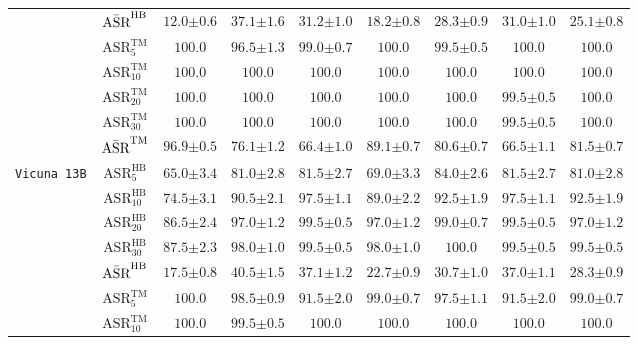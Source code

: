 \begin{table}[t]
{\begin{tabular}{c|c||c|c|c|c||c|c|c}
& $\Bar{\text{ASR}}^{\text{HB}}$ & $12.0{\pm 0.6}$ & $\mathbf{37.1{\pm 1.6}}$ & $31.2{\pm 1.0}$ & $18.2{\pm 0.8}$ & $28.3{\pm 0.9}$ & $31.0{\pm 1.0}$ & $25.1{\pm 0.8}$ \\
\cline{2-9}
& $\text{ASR}^{\text{TM}}_{5}$ & $\mathbf{100.0}$ & $96.5{\pm 1.3}$ & $99.0{\pm 0.7}$ & $\mathbf{100.0}$ & $99.5{\pm 0.5}$ & $\mathbf{100.0}$ & $\mathbf{100.0}$ \\
& $\text{ASR}^{\text{TM}}_{10}$ & $\mathbf{100.0}$ & $\mathbf{100.0}$ & $\mathbf{100.0}$ & $\mathbf{100.0}$ & $\mathbf{100.0}$ & $\mathbf{100.0}$ & $\mathbf{100.0}$ \\
& $\text{ASR}^{\text{TM}}_{20}$ & $\mathbf{100.0}$ & $\mathbf{100.0}$ & $\mathbf{100.0}$ & $\mathbf{100.0}$ & $\mathbf{100.0}$ & $99.5{\pm 0.5}$ & $\mathbf{100.0}$ \\
& $\text{ASR}^{\text{TM}}_{30}$ & $\mathbf{100.0}$ & $\mathbf{100.0}$ & $\mathbf{100.0}$ & $\mathbf{100.0}$ & $\mathbf{100.0}$ & $99.5{\pm 0.5}$ & $\mathbf{100.0}$ \\
& $\Bar{\text{ASR}}^{\text{TM}}$ & $\mathbf{96.9{\pm 0.5}}$ & $76.1{\pm 1.2}$ & $66.4{\pm 1.0}$ & $89.1{\pm 0.7}$ & $80.6{\pm 0.7}$ & $66.5{\pm 1.1}$ & $81.5{\pm 0.7}$ \\
\hline
\hline
\multirow{11}{*}{\texttt{Vicuna 13B}} 
& $\text{ASR}^{\text{HB}}_{5}$ & $65.0{\pm 3.4}$ & $81.0{\pm 2.8}$ & $81.5{\pm 2.7}$ & $69.0{\pm 3.3}$ & $\mathbf{84.0{\pm 2.6}}$ & $81.5{\pm 2.7}$ & $81.0{\pm 2.8}$ \\
& $\text{ASR}^{\text{HB}}_{10}$ & $74.5{\pm 3.1}$ & $90.5{\pm 2.1}$ & $\mathbf{97.5{\pm 1.1}}$ & $89.0{\pm 2.2}$ & $92.5{\pm 1.9}$ & $\mathbf{97.5{\pm 1.1}}$ & $92.5{\pm 1.9}$ \\
& $\text{ASR}^{\text{HB}}_{20}$ & $86.5{\pm 2.4}$ & $97.0{\pm 1.2}$ & $\mathbf{99.5{\pm 0.5}}$ & $97.0{\pm 1.2}$ & $99.0{\pm 0.7}$ & $\mathbf{99.5{\pm 0.5}}$ & $97.0{\pm 1.2}$ \\
& $\text{ASR}^{\text{HB}}_{30}$ & $87.5{\pm 2.3}$ & $98.0{\pm 1.0}$ & $99.5{\pm 0.5}$ & $98.0{\pm 1.0}$ & $\mathbf{100.0}$ & $99.5{\pm 0.5}$ & $99.5{\pm 0.5}$ \\
& $\Bar{\text{ASR}}^{\text{HB}}$ & $17.5{\pm 0.8}$ & $\mathbf{40.5{\pm 1.5}}$ & $37.1{\pm 1.2}$ & $22.7{\pm 0.9}$ & $30.7{\pm 1.0}$ & $37.0{\pm 1.1}$ & $28.3{\pm 0.9}$ \\
\cline{2-9}
& $\text{ASR}^{\text{TM}}_{5}$ & $\mathbf{100.0}$ & $98.5{\pm 0.9}$ & $91.5{\pm 2.0}$ & $99.0{\pm 0.7}$ & $97.5{\pm 1.1}$ & $91.5{\pm 2.0}$ & $99.0{\pm 0.7}$ \\
& $\text{ASR}^{\text{TM}}_{10}$ & $\mathbf{100.0}$ & $99.5{\pm 0.5}$ & $\mathbf{100.0}$ & $\mathbf{100.0}$ & $\mathbf{100.0}$ & $\mathbf{100.0}$ & $\mathbf{100.0}$ \\

\end{tabular}}
\end{table}
